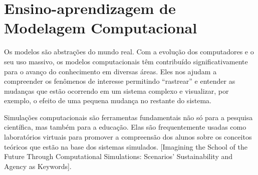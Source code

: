 \documentclass[
	12pt,				%
	openright,			%
	oneside,			%
	a4paper,			%
	main=brazil,
	english,			%
	]{ufsj-abntex2}
\begin{document}




\section{Ensino-aprendizagem de Modelagem Computacional} %


Os modelos são abstrações do mundo real. Com a evolução dos computadores e o seu uso massivo, os modelos computacionais têm contribuído significativamente para o avanço do conhecimento em diversas áreas. Eles nos ajudam a compreender os fenômenos de interesse permitindo “rastrear” e entender as mudanças que estão ocorrendo em um sistema complexo e visualizar, por exemplo, o efeito de uma pequena mudança no restante do sistema. 

Simulações computacionais são ferramentas fundamentais não só para a pesquisa científica, mas também para a educação. Elas são frequentemente usadas como laboratórios virtuais para promover a compreensão dos alunos sobre os conceitos teóricos que estão na base dos sistemas simulados. [Imagining the School of the Future Through Computational Simulations: Scenarios’ Sustainability and Agency as Keywords]. 
\end{document}
